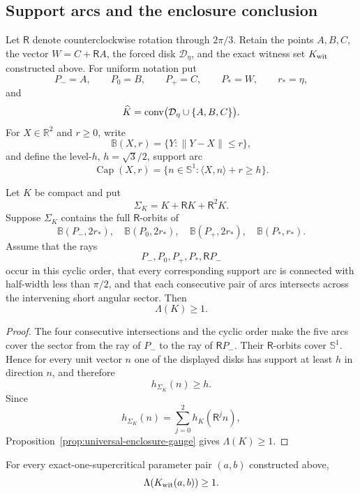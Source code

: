 \subsection{Support arcs and the enclosure conclusion}
\label{subsec:nine-point-conclusion}

Let $\mathsf R$ denote counterclockwise rotation through $2\pi/3$.  Retain
the points $A,B,C$, the vector $W=C+\mathsf RA$, the forced disk
$\mathcal D_\eta$, and the exact witness set $K_{\rm wit}$ constructed above.
For uniform notation put
\[
 P_-=A,\qquad P_0=B,\qquad P_+=C,\qquad
 P_\ast=W,\qquad r_\ast=\eta,
\]
and
\[
 \widehat K=\mathrm{conv}\bigl(\mathcal D_\eta\cup\{A,B,C\}\bigr).
\]
For $X\in\mathbb R^2$ and $r\ge0$, write
\[
 \mathbb B(X,r)=\{Y:\lVert Y-X\rVert\le r\},
\]
and define the level-$h$, $h=\sqrt3/2$, support arc
\[
 \operatorname{Cap}(X,r)
 =\{n\in\mathbb S^1:\langle X,n\rangle+r\ge h\}.
\]

\begin{lemma}
\label{lem:reader-cap-chain}
Let $K$ be compact and put
\[
 \Sigma_K=K+\mathsf RK+\mathsf R^2K.
\]
Suppose $\Sigma_K$ contains the full $\mathsf R$-orbits of
\[
 \mathbb B(P_-,2r_\ast),\quad
 \mathbb B(P_0,2r_\ast),\quad
 \mathbb B(P_+,2r_\ast),\quad
 \mathbb B(P_\ast,r_\ast).
\]
Assume that the rays
\[
 P_-,P_0,P_+,P_\ast,\mathsf RP_-
\]
occur in this cyclic order, that every corresponding support arc is connected
with half-width less than $\pi/2$, and that each consecutive pair of arcs
intersects across the intervening short angular sector.  Then
\[
 \Lambda(K)\ge1.
\]
\end{lemma}

\begin{proof}
The four consecutive intersections and the cyclic order make the five arcs
cover the sector from the ray of $P_-$ to the ray of $\mathsf RP_-$.  Their
$\mathsf R$-orbits cover $\mathbb S^1$.  Hence for every unit vector $n$ one
of the displayed disks has support at least $h$ in direction $n$, and
therefore
\[
 h_{\Sigma_K}(n)\ge h.
\]
Since
\[
 h_{\Sigma_K}(n)=\sum_{j=0}^2h_K(\mathsf R^jn),
\]
Proposition~\ref{prop:universal-enclosure-gauge} gives $\Lambda(K)\ge1$.
\end{proof}

\begin{theorem}
\label{thm:reader-witness-enclosure}
For every exact-one-supercritical parameter pair $(a,b)$ constructed above,
\[
 \Lambda(K_{\rm wit}(a,b))\ge1.
\]
\end{theorem}

